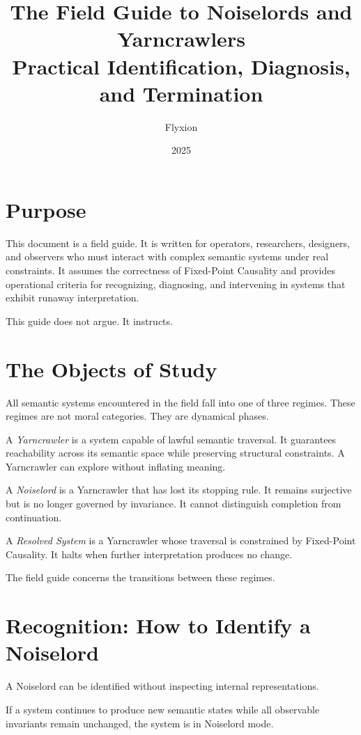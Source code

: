 \documentclass[12pt]{article}
\title{\textbf{The Field Guide to Noiselords and Yarncrawlers}\\
\large Practical Identification, Diagnosis, and Termination}
\author{Flyxion}
\date{2025}
\begin{document}
\maketitle

\section*{Purpose}

This document is a field guide. It is written for operators, researchers, designers, and observers who must interact with complex semantic systems under real constraints. It assumes the correctness of Fixed-Point Causality and provides operational criteria for recognizing, diagnosing, and intervening in systems that exhibit runaway interpretation.

This guide does not argue. It instructs.

\section{The Objects of Study}

All semantic systems encountered in the field fall into one of three regimes. These regimes are not moral categories. They are dynamical phases.

A \emph{Yarncrawler} is a system capable of lawful semantic traversal. It guarantees reachability across its semantic space while preserving structural constraints. A Yarncrawler can explore without inflating meaning.

A \emph{Noiselord} is a Yarncrawler that has lost its stopping rule. It remains surjective but is no longer governed by invariance. It cannot distinguish completion from continuation.

A \emph{Resolved System} is a Yarncrawler whose traversal is constrained by Fixed-Point Causality. It halts when further interpretation produces no change.

The field guide concerns the transitions between these regimes.

\section{Recognition: How to Identify a Noiselord}

A Noiselord can be identified without inspecting internal representations.

If a system continues to produce new semantic states while all observable invariants remain unchanged, the system is in Noiselord mode.
\end{document}
